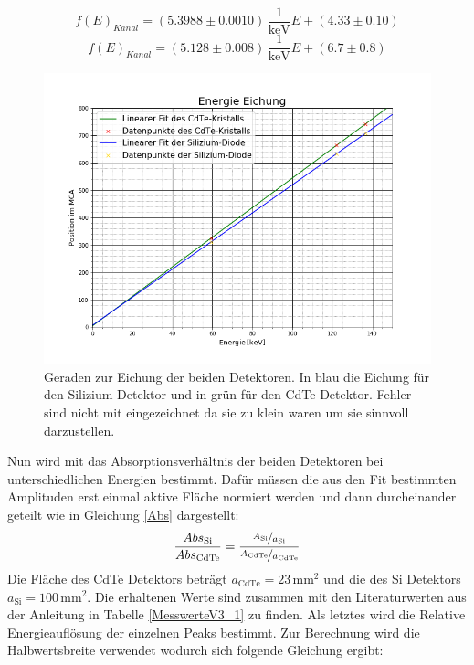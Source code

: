 \begin{equation*}
	f(E)_{Kanal} = (5.3988\pm 0.0010)\,\frac{1}{\text{keV}}E+(4.33\pm 0.10)
\end{equation*}
\begin{equation*}
f(E)_{Kanal} = (5.128\pm 0.008)\,\frac{1}{\text{keV}}E+(6.7\pm 0.8)
\end{equation*}
\begin{figure}[ht]
	\includegraphics[scale=0.5]{Bild/Eichung.png}
	\centering
	\caption[Eichung für beide Detektoren]{Geraden zur Eichung der beiden Detektoren. In blau die Eichung für den Silizium Detektor und in grün für den CdTe Detektor. Fehler sind nicht mit eingezeichnet da sie zu klein waren um sie sinnvoll darzustellen.}
	\label{Eichung}
\end{figure}
Nun wird mit das Absorptionsverhältnis der beiden Detektoren bei unterschiedlichen Energien bestimmt. Dafür müssen die aus den Fit bestimmten Amplituden erst einmal aktive Fläche normiert werden und dann durcheinander geteilt wie in Gleichung \ref{Abs} dargestellt:
\begin{eqnarray}
\frac{Abs_{\text{Si}}}{Abs_{\text{CdTe}}}=\frac{\nicefrac{A_{\text{Si}}}{a_{\text{Si}}}}{\nicefrac{A_{\text{CdTe}}}{a_{\text{CdTe}}}}
\label{Abs}
\end{eqnarray}
Die Fläche des CdTe Detektors beträgt $a_\text{CdTe}=23\,\text{mm}^2$ und die des Si Detektors $a_{\text{Si}}=100\,\text{mm}^2$. Die erhaltenen Werte sind zusammen mit den Literaturwerten aus der Anleitung\cite{anleitung} in Tabelle \ref{MesswerteV3_1} zu finden.
Als letztes wird die Relative Energieauflösung der einzelnen Peaks bestimmt. Zur Berechnung wird die Halbwertsbreite verwendet wodurch sich folgende Gleichung ergibt:
